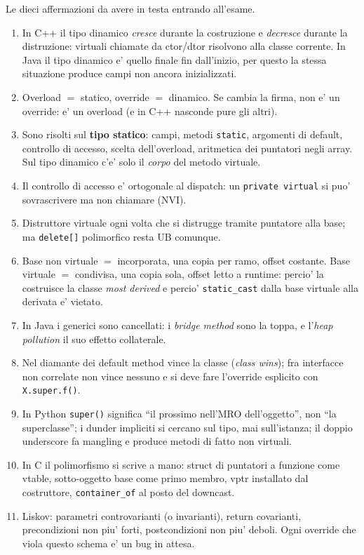 \documentclass{report}
\newcommand{\code}[1]{\texttt{\small #1}}
\begin{document}
Le dieci affermazioni da avere in testa entrando all'esame.

\begin{enumerate}
    \item In C++ il tipo dinamico \emph{cresce} durante la costruzione e
          \emph{decresce} durante la distruzione: virtuali chiamate da
          ctor/dtor risolvono alla classe corrente. In Java il tipo dinamico e'
          quello finale fin dall'inizio, per questo la stessa situazione produce
          campi non ancora inizializzati.
    \item Overload $=$ statico, override $=$ dinamico. Se cambia la firma, non
          e' un override: e' un overload (e in C++ nasconde pure gli altri).
    \item Sono risolti sul \textbf{tipo statico}: campi, metodi \code{static},
          argomenti di default, controllo di accesso, scelta dell'overload,
          aritmetica dei puntatori negli array. Sul tipo dinamico c'e' solo il
          \emph{corpo} del metodo virtuale.
    \item Il controllo di accesso e' ortogonale al dispatch: un
          \code{private virtual} si puo' sovrascrivere ma non chiamare (NVI).
    \item Distruttore virtuale ogni volta che si distrugge tramite puntatore
          alla base; ma \code{delete[]} polimorfico resta UB comunque.
    \item Base non virtuale $=$ incorporata, una copia per ramo, offset
          costante. Base virtuale $=$ condivisa, una copia sola, offset letto a
          runtime: percio' la costruisce la classe \emph{most derived} e percio'
          \code{static\_cast} dalla base virtuale alla derivata e' vietato.
    \item In Java i generici sono cancellati: i \emph{bridge method} sono la
          toppa, e l'\emph{heap pollution} il suo effetto collaterale.
    \item Nel diamante dei default method vince la classe (\emph{class wins});
          fra interfacce non correlate non vince nessuno e si deve fare
          l'override esplicito con \code{X.super.f()}.
    \item In Python \code{super()} significa ``il prossimo nell'MRO
          dell'oggetto'', non ``la superclasse''; i dunder impliciti si cercano
          sul tipo, mai sull'istanza; il doppio underscore fa mangling e produce
          metodi di fatto non virtuali.
    \item In C il polimorfismo si scrive a mano: struct di puntatori a funzione
          come vtable, sotto-oggetto base come primo membro, vptr installato dal
          costruttore, \code{container\_of} al posto del downcast.
    \item Liskov: parametri controvarianti (o invarianti), return covarianti,
          precondizioni non piu' forti, postcondizioni non piu' deboli. Ogni
          override che viola questo schema e' un bug in attesa.
\end{enumerate}
\end{document}
